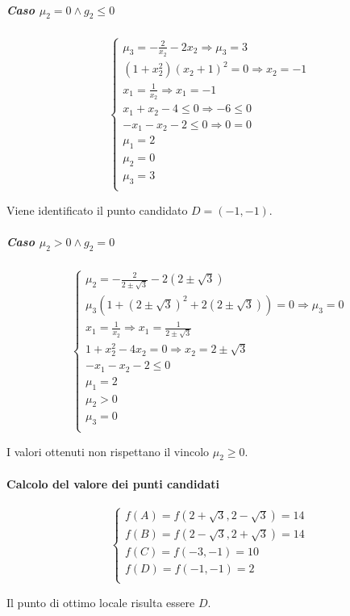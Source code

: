 \documentclass[\main/main.tex]{subfiles}
\begin{document}
\subparagraph*{Caso $\mu_2 = 0 \land g_2 \leq 0$}
\[
  \begin{cases}
    \mu_3 = -\frac{2}{x_2} - 2x_2  \Rightarrow \mu_3 = 3 \\
    (1 + x^2_2) (x_2+1)^2 = 0  \Rightarrow x_2 = -1      \\
    x_1 = \frac{1}{x_2}   \Rightarrow x_1 = -1           \\
    x_1 + x_2 -4 \leq 0       \Rightarrow -6 \leq 0      \\
    -x_1 - x_2 - 2 \leq 0 \Rightarrow  0 = 0             \\
    \mu_1 = 2                                            \\
    \mu_2 = 0                                            \\
    \mu_3 = 3                                            \\
  \end{cases}
\]

Viene identificato il punto candidato $D = (-1, -1)$.

\subparagraph*{Caso $\mu_2 > 0 \land g_2 = 0$}

\[
  \begin{cases}
    \mu_2 = -\frac{2}{2 \pm \sqrt{3}} - 2(2 \pm \sqrt{3})                        \\
    \mu_3 (1 + (2 \pm \sqrt{3})^2 + 2(2 \pm \sqrt{3})) = 0 \Rightarrow \mu_3 = 0 \\
    x_1 = \frac{1}{x_2}  \Rightarrow x_1 = \frac{1}{2 \pm \sqrt{3}}              \\
    1 + x^2_2 -4x_2 = 0  \Rightarrow x_2 = 2 \pm \sqrt{3}                        \\
    -x_1 - x_2 - 2 \leq 0                                                        \\
    \mu_1 = 2                                                                    \\
    \mu_2 > 0                                                                    \\
    \mu_3 = 0                                                                    \\
  \end{cases}
\]

I valori ottenuti non rispettano il vincolo $\mu_2 \geq 0$.

\paragraph*{Calcolo del valore dei punti candidati}

\[
  \begin{cases}
    f(A) = f(2+\sqrt3, 2 - \sqrt{3}) = 14  \\
    f(B) =  f(2-\sqrt3, 2 + \sqrt{3}) = 14 \\
    f(C) = f(-3, -1) = 10                  \\
    f(D) = f(-1, -1) = 2                   \\
  \end{cases}
\]

Il punto di ottimo locale risulta essere $D$.
\end{document}
